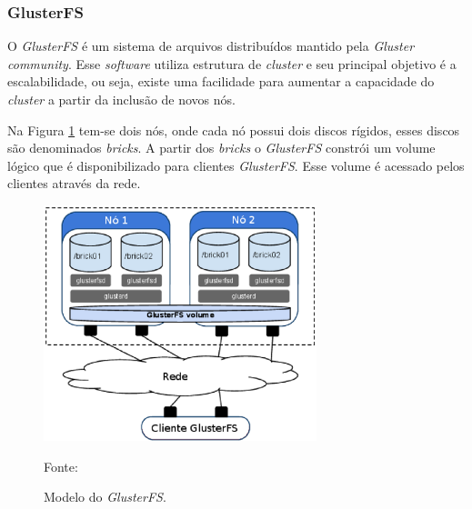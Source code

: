 \subsubsection{GlusterFS}
\label{section:glusterfs}
O \textit{GlusterFS} \cite{glusterfs} é um sistema de arquivos distribuídos mantido pela \textit{Gluster community}. Esse \textit{software} 
utiliza estrutura de \textit{cluster} e seu principal objetivo é a escalabilidade, ou seja, existe uma facilidade para aumentar a capacidade 
do \textit{cluster} a partir da inclusão de novos nós.

Na Figura \ref{fig:glusterfs} tem-se dois nós, onde cada nó possui dois discos rígidos, esses discos são denominados \textit{bricks}. 
A partir dos \textit{bricks} o \textit{GlusterFS} constrói um volume lógico que é disponibilizado para clientes \textit{GlusterFS}.
Esse volume é acessado pelos clientes através da rede.

\begin{figure}[h!]
 \centering
 \includegraphics[width=300px]{img/glusterfs.eps}
 \caption{Modelo do \textit{GlusterFS}.}
 Fonte: \citet{davies2013}
 \label{fig:glusterfs}
\end{figure}

